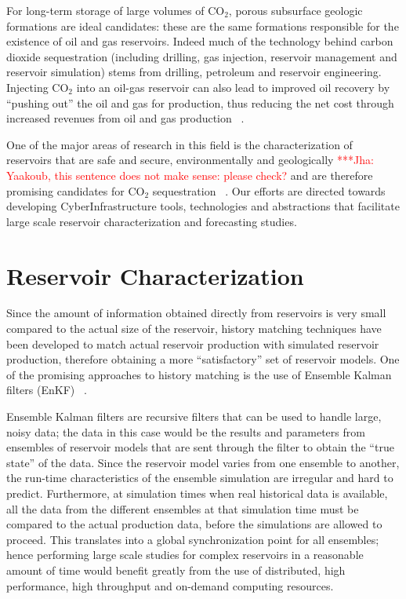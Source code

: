 \documentclass[10pt,conference,final]{IEEEtran}
\newcommand{\jhanote}[1]{ {\textcolor{red} { ***Jha: #1 }}}
\newcommand{\jhanote}[1]{}
\begin{document}
For long-term storage of large volumes of CO$_2$, porous subsurface geologic formations are ideal candidates: these are the same formations responsible for the existence of oil and gas reservoirs. Indeed much of the technology behind carbon dioxide sequestration (including drilling, gas injection, reservoir management and reservoir simulation) stems from drilling, petroleum and reservoir engineering. Injecting CO$_2$ into an oil-gas reservoir can also lead to improved oil recovery by ``pushing out'' the oil and gas for production, thus reducing the net cost through increased revenues from oil and gas production ~\cite{EORBook}.

One of the major areas of research in this field is the characterization of reservoirs that are safe and secure, environmentally and geologically \jhanote{Yaakoub, this sentence does not make sense: please check?} and are therefore promising candidates for CO$_2$ sequestration ~\cite{GeoRPT,Luigi}. Our efforts are directed towards developing CyberInfrastructure tools, technologies and abstractions that facilitate large scale reservoir characterization and forecasting studies.

\section*{Reservoir Characterization}

Since the amount of information obtained directly from reservoirs is very small compared 
to the actual size of the reservoir, 
history matching techniques have been developed to match actual reservoir production with 
simulated reservoir production, 
therefore obtaining a more ``satisfactory'' set of reservoir models. One of the promising approaches 
to history matching is the use of Ensemble Kalman filters (EnKF) ~\cite{KalmanPaper, 
DO2007, LiEnKF07, DO2006}.

Ensemble Kalman filters are recursive filters that can be used to handle large, noisy 
data; the data in this case would be the results and parameters from ensembles of 
reservoir models that are sent through the filter to obtain the ``true state'' of the 
data. Since the reservoir model varies from one ensemble to another, the run-time 
characteristics of the ensemble simulation are irregular and hard to predict. Furthermore, 
at simulation times when real historical data is available, all the data from the 
different ensembles at that simulation time must be compared to the actual production 
data, before the simulations are allowed to proceed. This translates into a global 
synchronization point for all ensembles; hence performing large scale studies for complex 
reservoirs in a reasonable amount of time would benefit greatly from the use of 
distributed, high performance, high throughput and on-demand computing resources.
\end{document}
